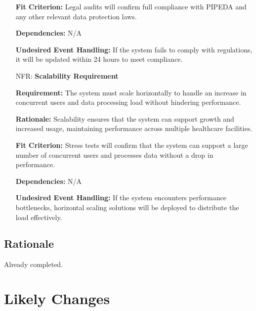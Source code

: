 \documentclass[12pt]{article}
\newcounter{nfrnum} %
\begin{document}
\begin{itemize}
    \textbf{Fit Criterion:} Legal audits will confirm full compliance with PIPEDA and any other relevant data protection laws.  

    \textbf{Dependencies:} N/A

    \textbf{Undesired Event Handling:} If the system fails to comply with regulations, it will be updated within 24 hours to meet compliance.

\item[NFR\refstepcounter{nfrnum}\thenfrnum \label{NFR_Scalability}:] \textbf{Scalability Requirement}

    \textbf{Requirement:} The system must scale horizontally to handle an increase in concurrent users and data processing load without hindering performance.

    \textbf{Rationale:} Scalability ensures that the system can support growth and increased usage, maintaining performance across multiple healthcare facilities.  

    \textbf{Fit Criterion:}  Stress tests will confirm that the system can support a large number of concurrent users and processes data without a drop in performance.  

    \textbf{Dependencies:} N/A

    \textbf{Undesired Event Handling:} If the system encounters performance bottlenecks, horizontal scaling solutions will be deployed to distribute the load effectively.

\end{itemize}

\subsection{Rationale}

Already completed.

\section{Likely Changes}
\end{document}
